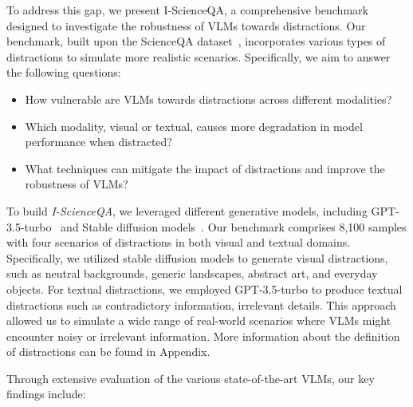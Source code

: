 To address this gap, we present I-ScienceQA, a comprehensive benchmark designed to investigate the robustness of VLMs towards distractions. Our benchmark, built upon the ScienceQA dataset~\citep{lu2022scienceqa}, incorporates various types of distractions to simulate more realistic scenarios. Specifically, we aim to answer the following questions:

\begin{itemize}[leftmargin=2em]
\setlength\itemsep{0em}
     \item How vulnerable are VLMs towards distractions across different modalities? 
     \item Which modality, visual or textual, causes more degradation in model performance when distracted? 
     \item What techniques can mitigate the impact of distractions and improve the robustness of VLMs? 
\end{itemize}

To build \emph{I-ScienceQA}, we leveraged different generative models, including GPT-3.5-turbo~\citep{openai2024gpt35turbo} and Stable diffusion models~\citep{Rombach2021HighResolutionIS}. Our benchmark comprises 8,100 samples with four scenarios of distractions in both visual and textual domains. Specifically, we utilized stable diffusion models to generate visual distractions, such as neutral backgrounds, generic landscapes, abstract art, and everyday objects. For textual distractions, we employed GPT-3.5-turbo to produce textual distractions such as contradictory information, irrelevant details. This approach allowed us to simulate a wide range of real-world scenarios where VLMs might encounter noisy or irrelevant information. More information about the definition of distractions can be found in Appendix.

Through extensive evaluation of the various state-of-the-art VLMs, our key findings include:

